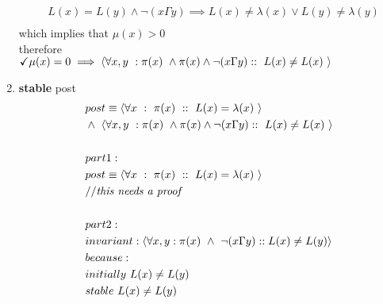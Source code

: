 \documentclass{article}
\begin{document}
\begin{enumerate}
\begin{align*}
&L(x) = L(y) \wedge \neg(x \Gamma y) \implies L(x)\neq\lambda(x) \vee L(y)\neq \lambda(y)\\
\end{align*}
which implies that
$\mu(x) > 0$\\
therefore\\
$\checkmark \mu(x)=0 \implies  \langle \forall x,y \ : \pi(x) \ \wedge \pi(x) \wedge \neg(x \Gamma y) :: \ L(x) \neq L(x)  \ \rangle\\$


\newpage
\item
\textbf{stable} post\\
\begin{align*}
&post \equiv \langle \forall x \ : \ \pi(x) \ :: \ L(x) = \lambda(x) \ \rangle\\
&\wedge \ \langle \forall x,y \ : \pi(x) \ \wedge \pi(x) \wedge \neg(x \Gamma y) :: \ L(x) \neq L(x)  \ \rangle\\
\\
&part 1:\\
&post \equiv \langle \forall x \ : \ \pi(x) \ :: \ L(x) = \lambda(x) \ \rangle\\
&//\emph{this needs a proof}\\
\\
&part 2:\\
&invariant: \langle \forall x,y : \pi(x) \ \wedge \ \neg(x\Gamma y) :: L(x)\neq L(y) \rangle\\
&because:\\
&initially \ L(x) \neq L(y)\\
&stable \ L(x) \neq L(y)\\
\end{align*}
\end{enumerate}
\end{document}
